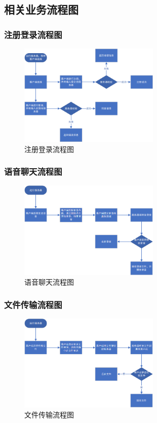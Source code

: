 \documentclass[UTF8,12pt]{article}
\begin{document}
\newpage

\subsection{相关业务流程图}
\subsubsection{注册登录流程图}
\begin{figure}[htbp]
    \centering
    \includegraphics[width=0.6\textwidth]{img/1.png}
    \caption{注册登录流程图}
\end{figure}

\subsubsection{语音聊天流程图}
\begin{figure}[htbp]
    \centering
    \includegraphics[width=0.6\textwidth]{img/2.png}
    \caption{语音聊天流程图}
\end{figure}

\subsubsection{文件传输流程图}
\begin{figure}[htbp]
    \centering
    \includegraphics[width=0.6\textwidth]{img/3.png}
    \caption{文件传输流程图}
\end{figure}
\end{document}
